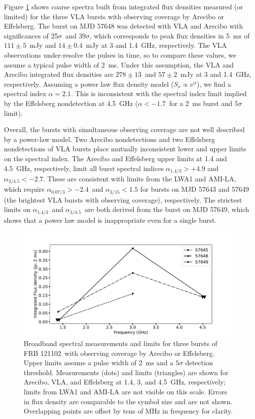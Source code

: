 \documentclass[twocolumn]{aastex61}
\newcommand{\frb}{FRB 121102}
\begin{document}
Figure \ref{fig:multi} shows coarse spectra built from integrated flux densities measured (or limited) for the three VLA bursts with observing coverage by Arecibo or Effelsberg. The burst on MJD 57648 was detected with VLA and Arecibo with significances of 25$\sigma$\ and 39$\sigma$, which corresponds to peak flux densities in 5~ms of $111\pm5$\ mJy and $14\pm0.4$\ mJy at 3 and 1.4~GHz, respectively. The VLA observations under-resolve the pulses in time, so to compare these values, we assume a typical pulse width of 2~ms. Under this assumption, the VLA and Arecibo integrated flux densities are $278\pm13$\ and $57\pm2$\ mJy at 3 and 1.4~GHz, respectively. Assuming a power law flux density model ($S_{\nu} \propto \nu^{\alpha}$), we find a spectral index $\alpha=2.1$. This is inconsistent with the spectral index limit implied by the Effelsberg nondetection at 4.5~GHz ($\alpha<-1.7$\ for a 2~ms burst and $5\sigma$ limit).

Overall, the bursts with simultaneous observing coverage are not well described by a power-law model. Two Arecibo nondetections and two Effelsberg nondetections of VLA bursts place mutually inconsistent lower and upper limits on the spectral index. The Arecibo and Effelsberg upper limits at 1.4 and 4.5~GHz, respectively, limit all burst spectral indices $\alpha_{1.4/3}>+4.9$ and $\alpha_{3/4.5}<-2.7$. These are consistent with limits from the LWA1 and AMI-LA, which require $\alpha_{0.07/3}>-2.4$\ and $\alpha_{3/15}<1.5$ for bursts on MJD 57643 and 57649 (the brightest VLA bursts with observing coverage), respectively. The strictest limits on $\alpha_{1.4/3}$\ and $\alpha_{3/4.5}$\ are both derived from the burst on MJD 57649, which shows that a power law model is inappropriate even for a single burst.

\begin{figure}[htb]
\begin{center}
 \includegraphics[width=\columnwidth]{multispec.pdf}
 \caption{Broadband spectral measurements and limits for three bursts of \frb\ with observing coverage by Arecibo or Effelsberg. Upper limits assume a pulse width of 2~ms and a $5\sigma$ detection threshold. Measurements (dots) and limits (triangles) are shown for Arecibo, VLA, and Effelsberg at 1.4, 3, and 4.5~GHz, respectively; limits from LWA1 and AMI-LA are not visible on this scale. Errors in flux density are comparable to the symbol size and are not shown. Overlapping points are offset by tens of MHz in frequency for clarity.
 \label{fig:multi}}
\end{center}
\end{figure}
\end{document}
